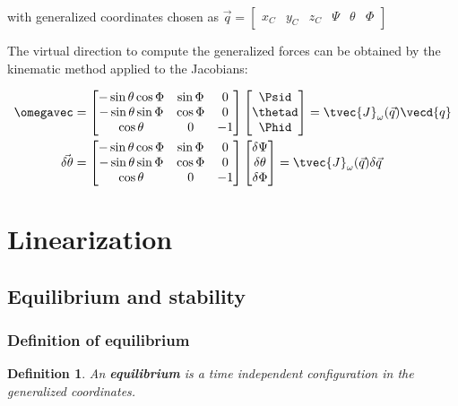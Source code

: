 \documentclass[10pt,a4paper]{scrartcl}
\newtheorem{define}{Definition}
\begin{document}
\begin{multicols*}{2}
with generalized coordinates chosen as $\vec{q}=\begin{bmatrix}
x_C&y_C&z_C&\Psi&\theta&\Phi
\end{bmatrix}$

The virtual direction to compute the generalized forces can be obtained by the kinematic method applied to the Jacobians:

\begin{align*}
\omegavec&=\begin{bmatrix}
-\sin\theta\cos\Phi&\sin\Phi&0\\
-\sin\theta\sin\Phi&\cos\Phi&0\\
\cos\theta&0&-1
\end{bmatrix}\begin{bmatrix}
\Psid\\\thetad\\\Phid
\end{bmatrix}
=\tvec{J}_\omega(\vec{q})\vecd{q}\\
\vec{\delta\theta}&=\begin{bmatrix}
-\sin\theta\cos\Phi&\sin\Phi&0\\
-\sin\theta\sin\Phi&\cos\Phi&0\\
\cos\theta&0&-1
\end{bmatrix}
\begin{bmatrix}
\delta\Psi\\
\delta\theta\\
\delta\Phi
\end{bmatrix}
=
\tvec{J}_\omega(\vec{q})\delta\vec{q}
\end{align*}

\section{Linearization}
\subsection{Equilibrium and stability}
\subsubsection{Definition of equilibrium}
\begin{define}
An \textbf{equilibrium} is a time independent configuration in the generalized coordinates.
\end{define}



\end{multicols*}
\end{document}
